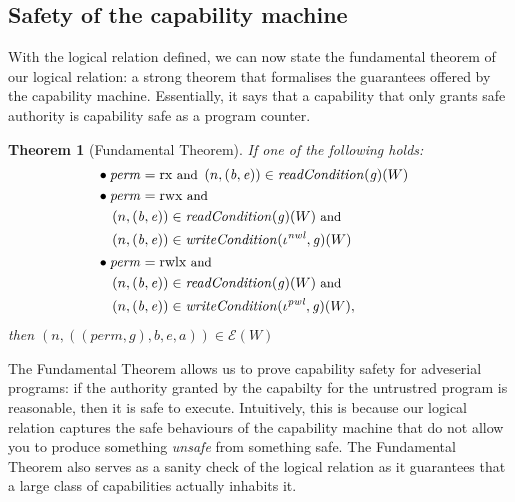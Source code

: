 \documentclass[compsoc,conference,letterpaper,fleqn]{IEEEtran}
\newtheorem{theorem}{Theorem}
\newcommand{\var}[1]{\mathit{#1}}
\newcommand{\gl}{\var{g}}
\newcommand{\addr}{\var{a}}
\newcommand{\start}{\var{b}}
\newcommand{\addrend}{\var{e}}
\newcommand{\perm}{\var{perm}}
\newcommand{\nwl}{\var{nwl}}
\newcommand{\pwl}{\var{pwl}}
\newcommand{\plainfun}[2]{
  \ifthenelse{\equal{#2}{}}
  {\mathit{#1}}
  {\mathit{#1}(#2)}
}
\newcommand{\readCond}[1]{\plainfun{readCondition}{#1}}
\newcommand{\writeCond}[1]{\plainfun{writeCondition}{#1}}
\newcommand{\asmType}{\plaindom{AsmType}}
\newcommand{\plaindom}[1]{\mathrm{#1}}
\newcommand{\intr}[2]{\mathcal{#1}}
\newcommand{\exprintr}[1]{\intr{E}{#1}}
\newcommand{\stder}{\exprintr{\asmType}}
\newcommand{\npair}[2][n]{\left(#1,#2 \right)}
\newcommand{\plainperm}[1]{\mathrm{#1}}
\newcommand{\exec}{\plainperm{rx}}
\newcommand{\rwx}{\plainperm{rwx}}
\newcommand{\rwlx}{\plainperm{rwlx}}
\begin{document}
\subsection{Safety of the capability machine}
With the logical relation defined, we can now state the fundamental theorem of
our logical relation: a strong theorem that formalises the guarantees offered by
the capability machine. Essentially, it says that a capability that only grants
safe authority is capability safe as a program counter.
\begin{theorem}[Fundamental Theorem]
  \label{thm:ftlr}
  If one of the following holds:
  \begin{align*}
      & \bullet
        \begin{aligned}[t]
        &\perm = \exec \text{\footnotesize{ and }}\npair{(\start,\addrend)} \in \readCond{}(\gl)(W)
      \end{aligned} \\
    & \bullet 
      \begin{aligned}[t]
        &\perm = \rwx \text{\footnotesize{ and }} \\
        &\npair{(\start,\addrend)} \in \readCond{}(\gl)(W) \text{\footnotesize{ and }}\\
        &\npair{(\start,\addrend)} \in \writeCond{}(\iota^\nwl,\gl)(W)
      \end{aligned} \\
    & \bullet 
      \begin{aligned}[t]
        &\perm = \rwlx \text{\footnotesize{ and }}\\
        &\npair{(\start,\addrend)} \in \readCond{}(\gl)(W) \text{\footnotesize{ and }}\\
        &\npair{(\start,\addrend)} \in \writeCond{}(\iota^\pwl,\gl)(W),
      \end{aligned}
  \end{align*}
  then $\npair{((\perm,\gl),\start,\addrend,\addr)} \in \stder(W)$
\end{theorem}
The Fundamental Theorem allows us to prove capability safety for
adveserial programs: if the authority granted by
the capabilty for the untrustred program is reasonable, then it is safe to
execute. Intuitively, this is because our logical relation captures the
safe behaviours of the capability machine that do not allow you to
produce something \emph{unsafe} from something safe. 
The Fundamental Theorem also serves as a sanity check of the
logical relation as it guarantees that a large class of capabilities
actually inhabits it.
\end{document}
